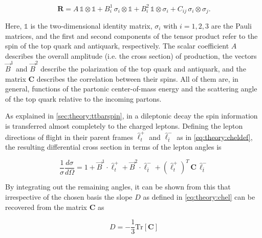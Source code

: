 \begin{equation}
    \mathbf{R} = A \, \mathbb{1} \otimes \mathbb{1}
    + B_i^1 \, \sigma_i \otimes \mathbb{1}
    + B_i^2 \, \mathbb{1} \otimes \sigma_i
    + C_{ij} \, \sigma_i \otimes \sigma_j.
\end{equation}

Here, $\mathbb{1}$ is the two-dimensional identity matrix, $\sigma_i$ with $i=1,2,3$ are the Pauli matrices, and the first and second components of the tensor product refer to the spin of the top quark and antiquark, respectively. The scalar coefficient $A$ describes the overall amplitude (i.e. the cross section) of \ttbar production, the vectors $\vec{B}^1$ and $\vec{B}^2$ describe the polarization of the top quark and antiquark, and the matrix $\mathbf{C}$ describes the correlation between their spins. All of them are, in general, functions of the partonic center-of-mass energy and the scattering angle of the top quark relative to the incoming partons.

As explained in \cref{sec:theory:ttbarspin}, in a dileptonic decay the spin information is transferred almost completely to the charged leptons. Defining the lepton directions of flight in their parent frames $\hat{\ell}_t^+$ and $\hat{\ell}_{\bar{t}}^-$ as in \cref{eq:theory:cheldef}, the resulting differential cross section in terms of the lepton angles is~\cite{Anuar:PhD}

\begin{equation}
    \frac{1}{\sigma} \frac{d \sigma}{d \Omega} = 1 + \vec{B}^1 \cdot \hat{\ell}_t^+ + \vec{B}^2 \cdot \hat{\ell}_{\bar{t}}^- + (\hat{\ell}_t^+)^T \, \mathbf{C} \, \hat{\ell}_{\bar{t}}^-
\end{equation}

By integrating out the remaining angles, it can be shown from this that irrespective of the chosen basis the slope $D$ as defined in \cref{eq:theory:chel} can be recovered from the matrix $\mathbf{C}$ as~\cite{Bernreuther:2004jv,Bernreuther:2017yhg}

\begin{equation}
    D = - \frac{1}{3} \mathrm{Tr} \left[ \mathbf{C} \right]
\end{equation}

